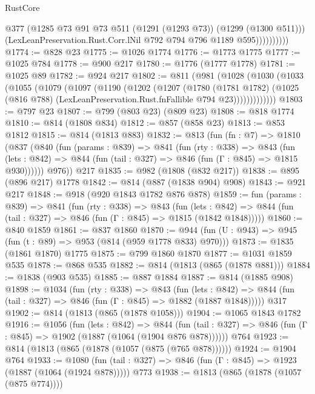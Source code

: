 \begin{lexlean}{RustCore}
\begin{coremodule}
                      @377
                      (@1285 @73 @91 @73 @511 (@1291 (@1293 @73)) (@1299 (@1300 @511)))
                      (LexLeanPreservation.Rust.Corr.lNil @792 @794 @796 @1189 @595))))))))))
@1774 := @828 @23
@1775 := @1026 @1774
@1776 := @1773 @1775
@1777 := @1025 @784
@1778 := @900 @217
@1780 := @1776 (@1777 @1778)
@1781 := @1025 @89
@1782 := @924 @217
@1802 := @811
    (@981
      (@1028
        (@1030
          (@1033
            (@1055
              (@1079
                (@1097
                  (@1190
                    (@1202
                      (@1207
                        (@1780
                          (@1781 @1782)
                          (@1025
                            (@816 @788)
                            (LexLeanPreservation.Rust.fnFallible @794 @23)))))))))))))
@1803 := @797 @23
@1807 := @799 (@803 @23) (@809 @23)
@1808 := @818 @1774
@1810 := @814 (@1808 @834)
@1812 := @857 (@858 @23)
@1813 := @853 @1812
@1815 := @814 (@1813 @883)
@1832 := @813
    (fun (fn : @7) =>
    @1810
      (@837
        (@840
          (fun (params : @839) =>
          @841
            (fun (rty : @338) =>
            @843
              (fun (lets : @842) =>
              @844 (fun (tail : @327) => @846 (fun (Γ : @845) => @1815 @930))))))
        @976))
    @217
@1835 := @982 (@1808 (@832 @217))
@1838 := @895 (@896 @217) @1778
@1842 := @814 (@887 (@1838 @904) @908)
@1843 := @921 @217
@1848 := @918 (@920 @1843 @1782 @876 @878)
@1859 := fun (params : @839) =>
  @841
    (fun (rty : @338) =>
    @843
      (fun (lets : @842) =>
      @844 (fun (tail : @327) => @846 (fun (Γ : @845) => @1815 (@1842 @1848)))))
@1860 := @840 @1859
@1861 := @837 @1860
@1870 := @944 (fun (U : @943) => @945 (fun (t : @89) => @953 (@814 (@959 @1778 @833) @970)))
@1873 := @1835 (@1861 @1870) @1775
@1875 := @799 @1860 @1870
@1877 := @1031 @1859 @535
@1878 := @868 @535
@1882 := @814 (@1813 (@865 (@1878 @881)))
@1884 := @1838 (@903 @535)
@1885 := @887 @1884
@1887 := @814 (@1885 @908)
@1898 := @1034
    (fun (rty : @338) =>
    @843
      (fun (lets : @842) =>
      @844 (fun (tail : @327) => @846 (fun (Γ : @845) => @1882 (@1887 @1848)))))
    @317
@1902 := @814 (@1813 (@865 (@1878 @1058)))
@1904 := @1065 @1843 @1782
@1916 := @1056
    (fun (lets : @842) =>
    @844 (fun (tail : @327) => @846 (fun (Γ : @845) => @1902 (@1887 (@1064 (@1904 @876 @878))))))
    @764
@1923 := @814 (@1813 (@865 (@1878 (@1057 (@875 (@765 @878))))))
@1924 := @1904 @764
@1933 := @1080
    (fun (tail : @327) => @846 (fun (Γ : @845) => @1923 (@1887 (@1064 (@1924 @878)))))
    @773
@1938 := @1813 (@865 (@1878 (@1057 (@875 @774))))

\end{coremodule}
\end{lexlean}
